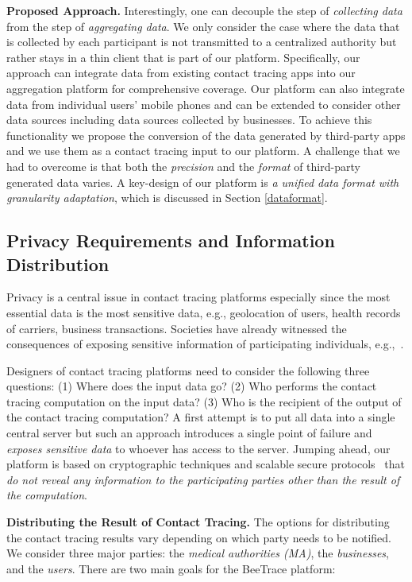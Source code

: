 \documentclass[11pt,dvipdfmx]{article}  %
\newcommand{\sysname}{\textsf{BeeTrace}\xspace}
\begin{document}
\textbf{Proposed Approach.} Interestingly, one can decouple the step of \emph{collecting data} from the step of \emph{aggregating data}. 
We only consider the case where the data that is collected by each participant is not transmitted to a centralized authority but rather stays in a thin client that is part of our platform. 
Specifically, our approach can integrate data from existing contact tracing apps into our aggregation platform for comprehensive coverage. 
Our platform can also integrate data from individual users' mobile phones and can be extended to consider other data sources including data sources collected by businesses. To achieve this functionality we propose the conversion of the data generated by third-party apps and we use them as a contact tracing input to our platform. A challenge that we had to overcome is that both the \emph{precision} and the \emph{format} of third-party generated data varies.
A key-design of our platform is \emph{a unified data format with granularity adaptation}, which is discussed in Section \ref{dataformat}.

\subsection{Privacy Requirements and Information Distribution}
\label{options}
Privacy is a central issue in contact tracing platforms especially since the most essential data is the most sensitive data, e.g., geolocation of users, health records of carriers, business transactions. 
Societies have already witnessed the consequences of exposing sensitive information of participating individuals, e.g.,~\cite{south-korea-privacy}. 

Designers of contact tracing platforms need to consider the following three questions: (1) Where does the input data go? (2) Who performs the contact tracing computation on the input data? (3) Who is the recipient of the output of the contact tracing computation?
A first attempt is to put all data into a single central server but such an approach introduces a single point of failure and  \emph{exposes sensitive data} to whoever has access to the server. 
Jumping ahead, our platform is based on cryptographic techniques and scalable secure protocols~\cite{pet18, Kales2019, SOda19} that \emph{do not reveal any information to the participating parties other than the result of the computation}.

\textbf{Distributing the Result of Contact Tracing.} %
The options for distributing the contact tracing results vary depending on which party needs to be notified. 
We consider three major parties: the \emph{medical authorities (MA)}, the \emph{businesses}, and the \emph{users}. There are two main goals for the \sysname platform:  
\end{document}
